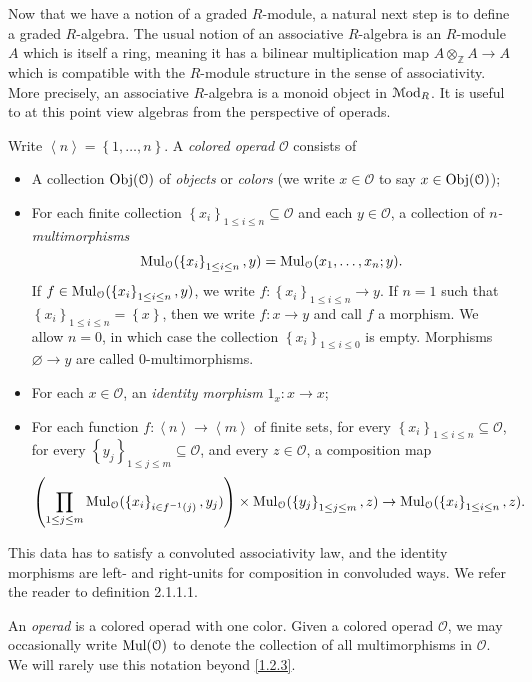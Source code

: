 Now that we have a notion of a graded $R$-module, a natural next step is to define a graded $R$-algebra. The usual notion of an associative $R$-algebra is an $R$-module $A$ which is itself a ring, meaning it has a bilinear multiplication map $A\otimes _\mathbb{Z} A \to A$ which is compatible with the $R$-module structure in the sense of associativity. More precisely, an associative $R$-algebra is a monoid object in $\mathcal{M}\mathrm{od} _R$. It is useful to at this point view algebras from the perspective of operads.

\begin{definition}\label{1.2.1}
	Write $\left\langle n \right\rangle =\left\{ 1, \ldots ,n \right\} $. A \emph{colored operad} $\mathcal{O} $ consists of
	\begin{itemize}
		\item A collection $\operatorname{Obj}(\mathcal{O} ) $ of \emph{objects} or \emph{colors} (we write $x\in \mathcal{O} $ to say $x\in \operatorname{Obj}(\mathcal{O} ) $);
		\item For each finite collection $\left\{ x_i \right\} _{1\leq i\leq n} \subseteq \mathcal{O} $ and each $y\in \mathcal{O} $, a collection of \emph{$n$-multimorphisms}
			\[
				\operatorname{Mul}_\mathcal{O} (\left\{ x_i \right\}_{1\leq i\leq n} ,y) = \operatorname{Mul}_\mathcal{O} (x_1, \ldots ,x_n ; y)
			.\]
			If $f\in\operatorname{Mul}_\mathcal{O} (\left\{ x_i \right\}_{1\leq i\leq n}  ,y)$, we write $f : \left\{ x_i \right\} _{1\leq i\leq n}  \to y$. If $n=1$ such that $\left\{ x_i \right\}_{1\leq i\leq n} =\left\{ x \right\} $, then we write $f : x \to y$ and call $f$ a morphism. We allow $n=0$, in which case the collection $\left\{ x_i \right\} _{1\leq i\leq 0} $ is empty. Morphisms $\varnothing \to y$ are called 0-multimorphisms.
		\item For each $x\in \mathcal{O} $, an \emph{identity morphism} $1_x : x \to x$;
		\item For each function $f : \left\langle n \right\rangle  \to \left\langle m \right\rangle $ of finite sets, for every $\left\{ x_i \right\}_{1\leq i\leq n} \subseteq \mathcal{O} $, for every $\left\{ y_j \right\} _{1\leq j\leq m} \subseteq \mathcal{O} $, and every $z\in \mathcal{O} $, a composition map
			\[
				\left(\prod_{1\leq j\leq m} \operatorname{Mul}_\mathcal{O}(\left\{ x_i \right\}_{i\in f^{-1} (j)} ,y_j)\right)\times \operatorname{Mul}_\mathcal{O} (\left\{ y_j \right\} _{1\leq j\leq m} ,z)\to \operatorname{Mul}_\mathcal{O} (\left\{ x_i \right\} _{1\leq i\leq n} ,z)
			.\]
	\end{itemize}
	This data has to satisfy a convoluted associativity law, and the identity morphisms are left- and right-units for composition in convoluded ways. We refer the reader to \cite{ha} definition 2.1.1.1.
\end{definition}
\begin{terminology}\label{1.2.2}
	An \emph{operad} is a colored operad with one color. Given a colored operad $\mathcal{O} $, we may occasionally write $\operatorname{Mul}(\mathcal{O} )$ to denote the collection of all multimorphisms in $\mathcal{O} $. We will rarely use this notation beyond \cref{1.2.3}.
\end{terminology}


